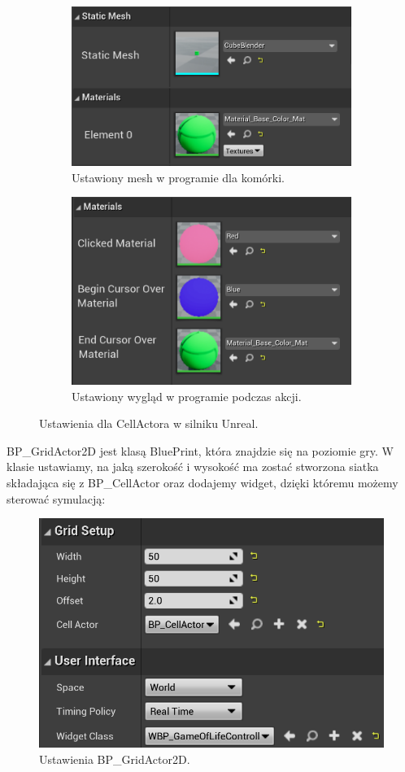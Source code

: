 \documentclass[a4paper,12pt,reqno]{article}
\begin{document}
\begin{figure}[!ht]%
	\centering
	\begin{subfigure}{.7\textwidth}
		\centering
		\includegraphics[width=0.8\linewidth]{graphics/gameoflife/CellActorInUE_1.png}
		\caption{Ustawiony mesh w programie dla komórki.}	
		\label{ref:subref_a}
	\end{subfigure}%
	
	\begin{subfigure}{.7\textwidth}
		\centering
		\includegraphics[width=0.8\linewidth]{graphics/gameoflife/CellActorInUE_2.png}
		\caption{Ustawiony wygląd w programie podczas akcji.}
		\label{ref:subref_b}
	\end{subfigure}%
	

\caption{Ustawienia dla CellActora w silniku Unreal.}
\label{ref:ref}
\end{figure}

BP\_GridActor2D jest klasą BluePrint, która znajdzie się na poziomie gry. W klasie ustawiamy, na jaką szerokość i wysokość ma zostać stworzona siatka składająca się z BP\_CellActor oraz dodajemy widget, dzięki któremu możemy sterować symulacją:

\begin{figure}[!ht]%
\centering
\includegraphics[width=0.6\columnwidth]{graphics/gameoflife/GridActor2DInUE_1.png}
\caption{Ustawienia BP\_GridActor2D.
\label{BPExample}}%
%
\qquad
\end{figure}  
\end{document}
